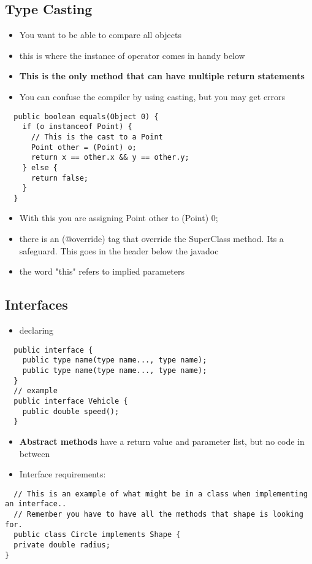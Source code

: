 \documentclass{article}
\begin{document}
\subsection{Type Casting}

\begin{itemize}
  \item You want to be able to compare all objects
  \item this is where the instance of operator comes in handy below
  \item \textbf{This is the only method that can have multiple return statements}
  \item You can confuse the compiler by using casting, but you may get errors
\end{itemize}

\begin{lstlisting}
  public boolean equals(Object 0) {
    if (o instanceof Point) {
      // This is the cast to a Point
      Point other = (Point) o;
      return x == other.x && y == other.y;
    } else {
      return false;
    }
  }
\end{lstlisting}

\begin{itemize}
  \item With this you are assigning Point other to (Point) 0;
  \item there is an (@override) tag that override the SuperClass method. Its a safeguard. This goes in the header below the javadoc
  \item the word "this" refers to implied parameters
\end{itemize}

\subsection{Interfaces}

\begin{itemize}
  \item declaring
\end{itemize}

\begin{lstlisting}
  public interface { 
    public type name(type name..., type name);
    public type name(type name..., type name);
  }
  // example
  public interface Vehicle {
    public double speed();
  }
\end{lstlisting}

\begin{itemize}
  \item \textbf{Abstract methods} have a return value and parameter list, but no code in between
\end{itemize}

\begin{itemize}
  \item Interface requirements:
\end{itemize}

\begin{lstlisting}
  // This is an example of what might be in a class when implementing an interface..
  // Remember you have to have all the methods that shape is looking for.
  public class Circle implements Shape {
  private double radius;
}
\end{lstlisting}
\end{document}
